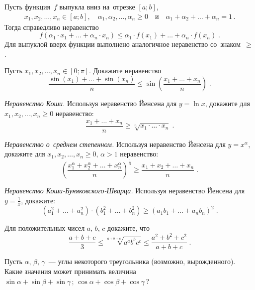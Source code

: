 \begin{problems}

\item{}
Пусть функция~$f$ выпукла вниз на~отрезке $[a;b]$,
\begin{gather*}
    x_1, x_2, \ldots, x_n \in [a; b]
,\quad
    \alpha_1, \alpha_2, \ldots, \alpha_n \geq 0
\quad\text{и}\quad
    \alpha_1 + \alpha_2 + \ldots + \alpha_n = 1
\,.\end{gather*}
Тогда справедливо неравенство
\[
    f(\alpha_1 \cdot x_1 + \ldots + \alpha_n \cdot x_n)
\leq
    \alpha_1 \cdot f(x_1) + \ldots + \alpha_n \cdot f(x_n)
\;.\]
Для выпуклой вверх функции выполнено аналогичное неравенство со~знаком~$\geq$.

\item
Пусть $x_1, x_2, \ldots, x_n \in [0; \pi]$.
Докажите неравенство 
\[
    \frac{\sin(x_1) + \ldots + \sin(x_n)}{n}
\leq
    \sin\left(
        \frac{x_1 + \ldots + x_n}{n}
    \right)
\;.\]

\item\emph{Неравенство Коши.}
Используя неравенство Йенсена для $y = \ln x$, докажите для
$x_1, x_2, \ldots, x_n \geq 0$ неравенство:
\[
    \frac{x_1 + \ldots + x_n}{n}
\geq
    \sqrt[n]{x_1 \cdot \ldots \cdot x_n}
\;.\]

\item\emph{Неравенство о~среднем степенном.}
Используя неравенство Йенсена для $y = x^{\alpha}$, докажите для
$x_1, x_2, \ldots, x_n \geq 0$, $\alpha > 1$ неравенство:
\[
    \left(
        \frac{
            x_1^{\alpha} + x_2^{\alpha} + \ldots + x_n^{\alpha}
        }{n}
    \right)^{\frac{1}{\alpha}}
\geq
    \frac{x_1 + x_2 + \ldots + x_n}{n}
\;.\]

\item\emph{Неравенство Коши-Буняковского-Шварца.}
Используя неравенство Йенсена для $y = \frac{1}{x}$, докажите:
\[
    (a_1^2 + \ldots + a_n^2) \cdot (b_1^2 + \ldots + b_n^2)
\geq
    (a_1 b_1 + \ldots + a_n b_n)^2
\;.\]

\item
Для положительных чисел $a$, $b$, $c$ докажите, что
\[
    \frac{a + b + c}{3}
\leq
    \sqrt[a+b+c]{a^a b^b c^c}
\leq
    \frac{a^2 + b^2 + c^2}{a + b + c}
\;.\]

\item
Пусть $\alpha$, $\beta$, $\gamma$~--- углы некоторого треугольника
(возможно, вырожденного).
Какие значения может принимать величина
\\
\subproblem $\sin \alpha + \sin \beta + \sin \gamma$\,;
\quad
\subproblem $\cos \alpha + \cos \beta + \cos \gamma$\,?


\end{problems}
